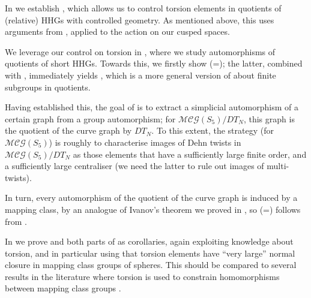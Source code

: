 \documentclass[svgnames]{amsart}
\theoremstyle{plain}
\theoremstyle{definition}
\newcommand{\MCG}{\mathcal{MCG}}
\begin{document}
In  we establish , which allows us to control torsion elements in quotients of (relative) HHGs with controlled geometry. As mentioned above, this uses arguments from \cite{HHP:coarse}, applied to the action on our cusped spaces.

We leverage our control on torsion in , where we study automorphisms of quotients of short HHGs. Towards this, we firstly show (=); the latter, combined with , immediately yields , which is a more general version of  about finite subgroups in quotients. 

Having established this, the goal of  is to extract a simplicial automorphism of a certain graph from a group automorphism; for $\MCG(S_5)/DT_N$, this graph is the quotient of the curve graph by $DT_N$. To this extent, the strategy (for $\MCG(S_5)$) is roughly to characterise images of Dehn twists in $\MCG(S_5)/DT_N$ as those elements that have a sufficiently large finite order, and a sufficiently large centraliser (we need the latter to rule out images of multi-twists). 

In turn, every automorphism of the quotient of the curve graph is induced by a mapping class, by an analogue of Ivanov's theorem we proved in \cite{rigidity_mcg_mod_dt}, so (=) follows from .

In  we prove  and both parts of  as corollaries, again exploiting knowledge about torsion, and in particular using that torsion elements have ``very large'' normal closure in mapping class groups of spheres. This should be compared to several results in the literature where torsion is used to constrain homomorphisms between mapping class groups \cite{HarveyKorkmaz,ChenLanier}.


\end{document}
